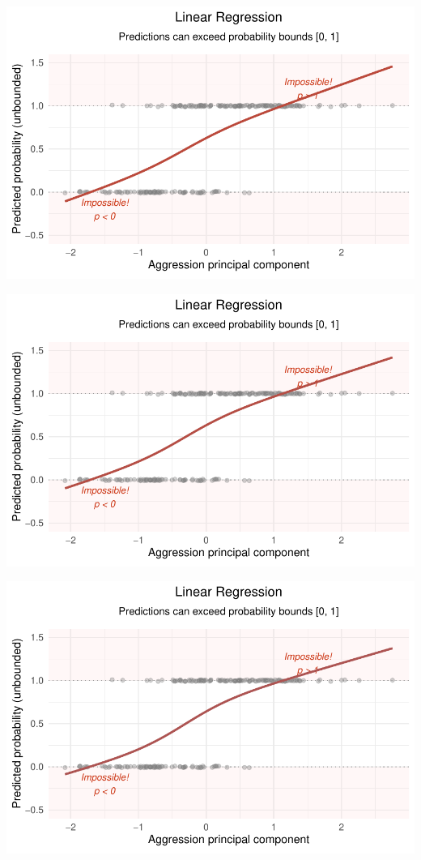 \documentclass[
  letterpaper,
  DIV=11,
  numbers=noendperiod]{scrartcl}
\begin{document}
\begin{center}
\includegraphics[width=0.8\linewidth,height=\textheight,keepaspectratio]{Beyond!!!_files/figure-pdf/unnamed-chunk-4-33.pdf}
\end{center}

\begin{center}
\includegraphics[width=0.8\linewidth,height=\textheight,keepaspectratio]{Beyond!!!_files/figure-pdf/unnamed-chunk-4-34.pdf}
\end{center}

\begin{center}
\includegraphics[width=0.8\linewidth,height=\textheight,keepaspectratio]{Beyond!!!_files/figure-pdf/unnamed-chunk-4-35.pdf}
\end{center}
\end{document}
